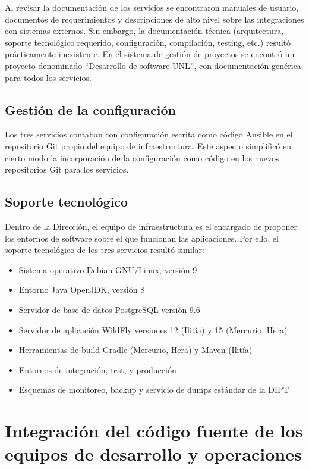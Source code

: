 Al revisar la documentación de los servicios se encontraron manuales
de usuario, documentos de requerimientos y descripciones de alto nivel
sobre las integraciones con sistemas externos. Sin embargo, la
documentación técnica (arquitectura, soporte tecnológico requerido,
configuración, compilación, testing, etc.) resultó prácticamente
inexistente. En el sistema de gestión de proyectos se encontró un
proyecto denominado ``Desarrollo de software UNL'', con documentación
genérica para todos los servicios.

\subsection{Gestión de la configuración}

Los tres servicios contaban con configuración escrita como código
Ansible en el repositorio Git propio del equipo de
infraestructura. Este aspecto simplificó en cierto modo la
incorporación de la configuración como código en los nuevos
repositorios Git para los servicios.

\subsection{Soporte tecnológico}

Dentro de la Dirección, el equipo de infraestructura es el encargado
de proponer los entornos de software sobre el que funcionan las
aplicaciones. Por ello, el soporte tecnológico de los tres servicios
resultó similar:

\begin{itemize}
\item Sistema operativo Debian GNU/Linux, versión 9
\item Entorno Java OpenJDK, versión 8
\item Servidor de base de datos PostgreSQL versión 9.6
\item Servidor de aplicación WildFly versiones 12 (Ilitía) y 15
  (Mercurio, Hera)
\item Herramientas de build Gradle (Mercurio, Hera) y Maven (Ilitía)
\item Entornos de integración, test, y producción
\item Esquemas de monitoreo, backup y servicio de dumps estándar de la
  DIPT
\end{itemize}
\section{Integración del código fuente de los equipos de desarrollo y operaciones}

